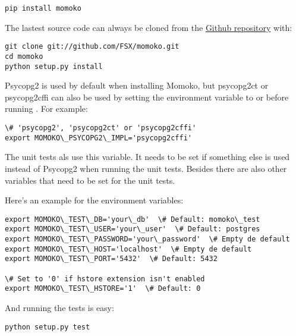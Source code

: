 \documentclass[letterpaper,10pt,english]{sphinxmanual}
\begin{document}
\begin{Verbatim}[commandchars=\\\{\}]
pip install momoko
\end{Verbatim}

The lastest source code can always be cloned from the \href{https://github.com/FSX/momoko}{Github repository} with:

\begin{Verbatim}[commandchars=\\\{\}]
git clone git://github.com/FSX/momoko.git
cd momoko
python setup.py install
\end{Verbatim}

Psycopg2 is used by default when installing Momoko, but psycopg2ct or psycopg2cffi
can also be used by setting the  environment variable to
 or  before running . For example:

\begin{Verbatim}[commandchars=\\\{\}]
\# 'psycopg2', 'psycopg2ct' or 'psycopg2cffi'
export MOMOKO\_PSYCOPG2\_IMPL='psycopg2cffi'
\end{Verbatim}

The unit tests als use this variable. It needs to be set if something else is used
instead of Psycopg2 when running the unit tests. Besides 
there are also other variables that need to be set for the unit tests.

Here's an example for the environment variables:

\begin{Verbatim}[commandchars=\\\{\}]
export MOMOKO\_TEST\_DB='your\_db'  \# Default: momoko\_test
export MOMOKO\_TEST\_USER='your\_user'  \# Default: postgres
export MOMOKO\_TEST\_PASSWORD='your\_password'  \# Empty de default
export MOMOKO\_TEST\_HOST='localhost'  \# Empty de default
export MOMOKO\_TEST\_PORT='5432'  \# Default: 5432

\# Set to '0' if hstore extension isn't enabled
export MOMOKO\_TEST\_HSTORE='1'  \# Default: 0
\end{Verbatim}

And running the tests is easy:

\begin{Verbatim}[commandchars=\\\{\}]
python setup.py test
\end{Verbatim}
\end{document}
